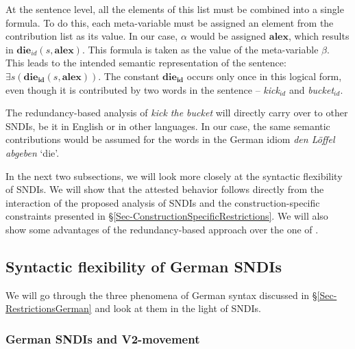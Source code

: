 \documentclass[output=paper]{langsci/langscibook}
\begin{document}
At the sentence level,  all the elements of this list must be combined into a single formula. 
To do this, each meta-variable must be assigned an element from the contribution list as its value. In our case, $\alpha$ would be assigned $\mathbf{alex}$, which results in $\mathbf{die}_{id}(s,\mathbf{alex})$. 
This formula is taken as the value of the meta-variable $\beta$. 
This leads to the intended semantic representation of the sentence: $\exists s (\mathbf{die_{id}}(s,\mathbf{alex}))$. 
The constant $\mathbf{die_{id}}$ occurs only once in this logical form, even though it is contributed by two words in the sentence -- \textit{kick}$_{id}$ and \textit{bucket}$_{id}$.

The redundancy-based analysis of \textit{kick the bucket} will directly carry over to other SNDIs, be it in English or in other languages. In our case, the same semantic contributions would be assumed for the words in the  German idiom \textit{den L\"offel abgeben} `die'.

In the next two subsections, we will look more closely at the syntactic flexi\-bility of SNDIs. We will show that the attested behavior follows directly from the interaction of the proposed analysis of SNDIs and the construction-specific constraints presented in §\ref{Sec-ConstructionSpecificRestrictions}. We will also show some advantages of the redundancy-based approach over the one of \cite{kaysagidioms}.
 
\subsection{Syntactic flexibility of German SNDIs}
\label{Sec-AnalysisGerman}

 We will go through the three phenomena of   German syntax discussed in §\ref{Sec-RestrictionsGerman} and look at them in the light of SNDIs.

 
\subsubsection{German SNDIs and V2-movement}
\end{document}
